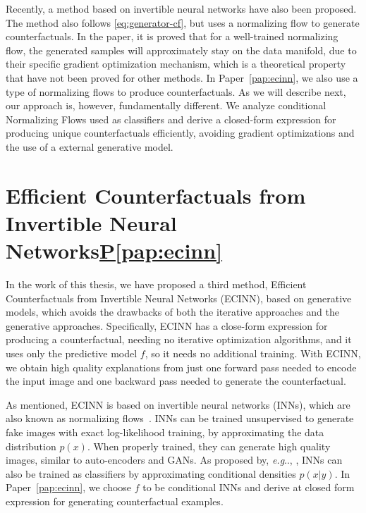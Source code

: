 \documentclass[11pt,a4paper,twoside,openright,final]{memoir}
\makeatletter
\DeclareRobustCommand\onedot{\futurelet\@let@token\@onedot}
\def\@onedot{\ifx\@let@token.\else.\null\fi\xspace}
\def\eg{\emph{e.g}\onedot} \def\Eg{\emph{E.g}\onedot}
\newcommand\contribution[1]{\hspace{0.5em}\hyperref[#1]{P\ref{#1}}}
\newcommand*{\paperref}[1]{Paper~\hyperref[#1]{\ref{#1}}}
\makeatother
\begin{document}
Recently, a method based on invertible neural networks have also been proposed.
The method also follows \eqref{eq:generator-cf}, but uses a normalizing flow to generate counterfactuals. 
In the paper, it is proved that for a well-trained normalizing flow,  the generated samples will approximately stay on the data manifold, due to their specific gradient optimization mechanism, which is a theoretical property that have not been proved for other methods.
In \paperref{pap:ecinn}, we also use a type of normalizing flows to produce counterfactuals. 
As we will describe next, our approach is, however, fundamentally different. 
We analyze conditional Normalizing Flows used as classifiers and derive a closed-form expression for producing unique counterfactuals efficiently, avoiding gradient optimizations and the use of a external generative model.

\section{Efficient Counterfactuals from Invertible Neural Networks\contribution{pap:ecinn}}\label{sec:ecinn}
In the work of this thesis, we have proposed a third method, Efficient Counterfactuals from Invertible Neural Networks (ECINN), based on generative models, which avoids the drawbacks of both the iterative approaches and the generative approaches.
Specifically, ECINN has a close-form expression for producing a counterfactual, needing no iterative optimization algorithms, and it uses only the predictive model $f$, so it needs no additional training. 
With ECINN, we obtain high quality explanations from just one forward pass needed to encode the input image and one backward pass needed to generate the counterfactual. 

As mentioned, ECINN is based on invertible neural networks (INNs), which are also known as normalizing flows~\cite{realnvp, nice, glow}.
INNs can be trained unsupervised to generate fake images with exact log-likelihood training, by approximating the data distribution $p(x)$.
When properly trained, they can generate high quality images, similar to auto-encoders and GANs.
As proposed by, \eg, \citet{ibinn}, INNs can also be trained as classifiers by approximating conditional densities $p(x | y)$.  
In \paperref{pap:ecinn}, we choose $f$ to be conditional INNs and derive at closed form expression for generating counterfactual examples. 
\end{document}
